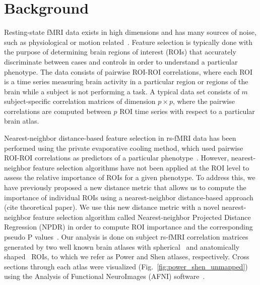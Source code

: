 \documentclass[10pt,letterpaper]{article}\usepackage[]{graphicx}\usepackage[]{color}
\begin{document}
\section{Background}
Resting-state fMRI data exists in high dimensions and has many sources of noise, such as physiological or motion related~\cite{caballero2017}. Feature selection is typically done with the purpose of determining brain regions of interest (ROIs) that accurately discriminate between cases and controls in order to understand a particular phenotype. The data consists of pairwise ROI-ROI correlations, where each ROI is a time series measuring brain activity in a particular region or regions of the brain while a subject is not performing a task. A typical data set consists of $m$ subject-specific correlation matrices of dimension $p \times p$, where the pairwise correlations are computed between $p$ ROI time series with respect to a particular brain atlas. 

Nearest-neighbor distance-based feature selection in rs-fMRI data has been performed using the private evaporative cooling method, which used pairwise ROI-ROI correlations as predictors of a particular phenotype~\cite{le17}. However, nearest-neighbor feature selection algorithms have not been applied at the ROI level to assess the relative importance of ROIs for a given phenotype. To address this, we have previously proposed a new distance metric that allows us to compute the importance of individual ROIs using a nearest-neighbor distance-based approach (cite theoretical paper). We use this new distance metric with a novel nearest-neighbor feature selection algorithm called Nearest-neighbor Projected Distance Regression (NPDR) in order to compute ROI importance and the corresponding pseudo P values~\cite{npdr}. Our analysis is done on subject rs-fMRI correlation matrices generated by two well known brain atlases with spherical~\cite{power2011} and anatomically shaped~\cite{shen2013} ROIs, to which we refer as Power and Shen atlases, respectively. Cross sections through each atlas were visualized (Fig.~\ref{fig:power_shen_unmapped}) using the Analysis of Functional NeuroImages (AFNI) software~\cite{cox1996}.

\vspace{0.25cm}
\end{document}
